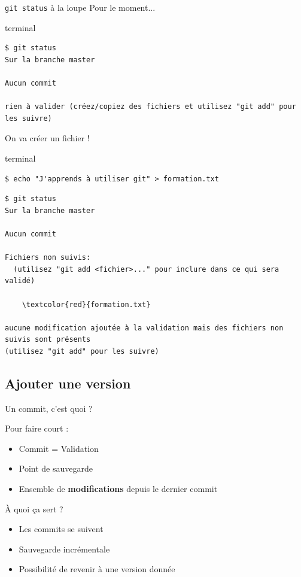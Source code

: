 \documentclass[usepdftitle=false]{beamer}
\def\seplength{.5\topsep}
\newcommand{\Pause}{%
\ifdef{\Release}
  {\pause}
  {}
}
\begin{document}
\begin{frame}[fragile]{\texttt{git status} à la loupe}
	Pour le moment...

	\begin{beamercolorbox}[rounded=true,shadow=true]{terminal}
\vspace{-\seplength}
\begin{Verbatim}
$ git status
Sur la branche master

Aucun commit

rien à valider (créez/copiez des fichiers et utilisez "git add" pour les suivre)
\end{Verbatim}
	\end{beamercolorbox}

	On va créer un fichier !

	\begin{beamercolorbox}[rounded=true,shadow=true]{terminal}
\vspace{-\seplength}
\begin{Verbatim}
$ echo "J'apprends à utiliser git" > formation.txt
\end{Verbatim}
\Pause
\vspace{-\seplength}
\begin{Verbatim}
$ git status
Sur la branche master

Aucun commit

Fichiers non suivis:
  (utilisez "git add <fichier>..." pour inclure dans ce qui sera validé)

	\textcolor{red}{formation.txt}

aucune modification ajoutée à la validation mais des fichiers non suivis sont présents
(utilisez "git add" pour les suivre)

\end{Verbatim}
\end{beamercolorbox}

\end{frame}

\subsection{Ajouter une version}

\begin{frame}{Un commit, c'est quoi ?}

Pour faire court :
\begin{itemize}
\item Commit = Validation
\item Point de sauvegarde
\item Ensemble de \textbf{modifications} depuis le dernier commit
\end{itemize}

\bigskip

\`A quoi ça sert ?
\begin{itemize}
\item Les commits se suivent
\item Sauvegarde incrémentale
\item Possibilité de revenir à une version donnée
\end{itemize}
\end{frame}
\end{document}
